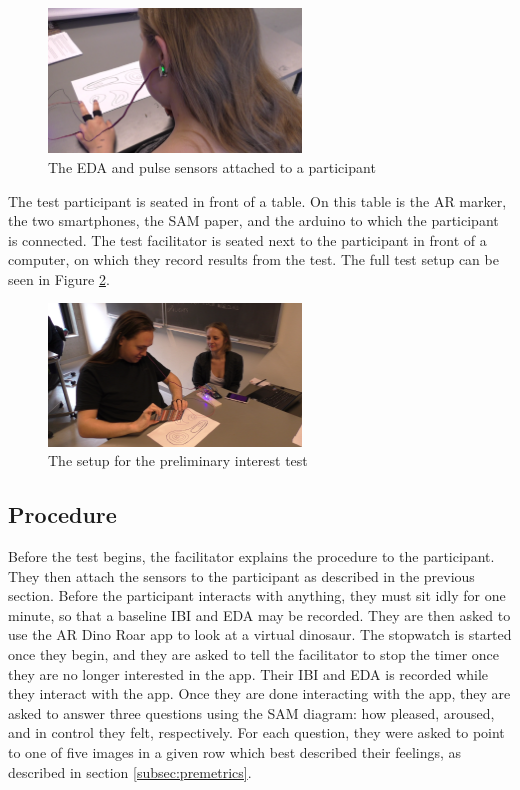 \begin{figure}[h!]
    \centering
    \includegraphics[width=0.6\textwidth]{figures/pretest_ear.png}
    \caption{The EDA and pulse sensors attached to a participant}\label{fig:pretest_ear}
\end{figure}

The test participant is seated in front of a table. On this table is the AR marker, the two smartphones, the SAM paper, and the arduino to which the participant is connected. The test facilitator is seated next to the participant in front of a computer, on which they record results from the test. The full test setup can be seen in Figure \ref{fig:pretest_setup}.

\begin{figure}[h!]
    \centering
    \includegraphics[width=0.6\textwidth]{figures/pretest_setup.png}
    \caption{The setup for the preliminary interest test}\label{fig:pretest_setup}
\end{figure}

\subsection{Procedure}
Before the test begins, the facilitator explains the procedure to the participant. They then attach the sensors to the participant as described in the previous section. Before the participant interacts with anything, they must sit idly for one minute, so that a baseline IBI and EDA may be recorded. They are then asked to use the AR Dino Roar app to look at a virtual dinosaur. The stopwatch is started once they begin, and they are asked to tell the facilitator to stop the timer once they are no longer interested in the app. Their IBI and EDA is recorded while they interact with the app. Once they are done interacting with the app, they are asked to answer three questions using the SAM diagram: how pleased, aroused, and in control they felt, respectively. For each question, they were asked to point to one of five images in a given row which best described their feelings, as described in section \ref{subsec:premetrics}.

